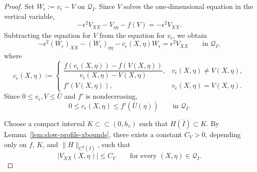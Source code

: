 \documentclass[10pt,a4paper]{amsart}
\begin{document}
\begin{proof}
Set $W_\epsilon:=v_\epsilon-V$
on $\mathcal Q_I$.  Since $V$ solves the one-dimensional equation in the
vertical variable,
$$
-\epsilon^2V_{XX}-V_{\eta\eta}-f(V)=-\epsilon^2V_{XX}.
$$
Subtracting the equation for $V$ from the equation for $v_\epsilon$, we
obtain
\begin{equation}\label{eq:difference-equation}
-\epsilon^2 (W_\epsilon)_{XX}-(W_\epsilon)_{\eta\eta}-c_\epsilon(X,\eta)W_\epsilon
=\epsilon^2 V_{XX}
\qquad\text{in }\mathcal Q_I,
\end{equation}
where
$$
c_\epsilon(X,\eta):=
\begin{cases}
\dfrac{f(v_\epsilon(X,\eta))-f(V(X,\eta))}{v_\epsilon(X,\eta)-V(X,\eta)},
& v_\epsilon(X,\eta)\ne V(X,\eta),\\
f'(V(X,\eta)),& v_\epsilon(X,\eta)=V(X,\eta).
\end{cases}
$$
Since $0\le v_\epsilon,V\le\overline U$ and $f'$ is nondecreasing,
\begin{equation}\label{eq:ceps-bound}
    0\le c_\epsilon(X,\eta)\le f'(\overline U(\eta))
\qquad\text{in }\mathcal Q_I.
\end{equation}

 


Choose a compact  interval
$K\subset\subset(0,h_c)$ such that $ H(\overline I)\subset K.$
By Lemma~\ref{lem:slow-profile-xbounds}, there exists a constant $C_V>0$,
depending only on $f$, $K$, and $\|H\|_{C^2(\overline I)}$, such that
\begin{equation}\label{eq:VXX-bound}
|V_{XX}(X,\eta)|\le C_V
\qquad\text{for every }(X,\eta)\in\mathcal Q_I.
\end{equation}


\end{proof}
\end{document}
